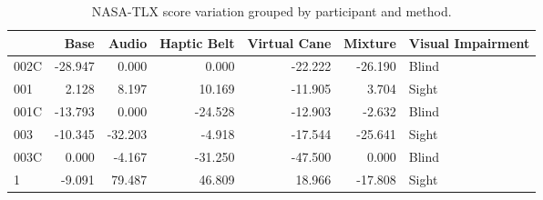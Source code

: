 
\begin{table}[!htb]
\centering
\caption{NASA-TLX score variation grouped by participant and method.}
\label{tab:nasa_var}
\begin{tabular}{lrrrrrl}
\toprule
{} &    Base &   Audio &  Haptic Belt &  Virtual Cane &  Mixture & Visual Impairment \\
\midrule
002C & -28.947 &   0.000 &        0.000 &       -22.222 &  -26.190 &             Blind \\
001  &   2.128 &   8.197 &       10.169 &       -11.905 &    3.704 &             Sight \\
001C & -13.793 &   0.000 &      -24.528 &       -12.903 &   -2.632 &             Blind \\
003  & -10.345 & -32.203 &       -4.918 &       -17.544 &  -25.641 &             Sight \\
003C &   0.000 &  -4.167 &      -31.250 &       -47.500 &    0.000 &             Blind \\
1    &  -9.091 &  79.487 &       46.809 &        18.966 &  -17.808 &             Sight \\
\bottomrule
\end{tabular}
\end{table}

